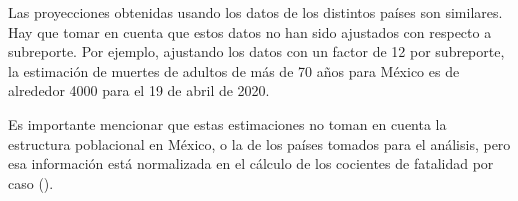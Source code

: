 Las proyecciones obtenidas usando los datos de los distintos países son similares. Hay que tomar en cuenta que estos datos no han sido ajustados con respecto a subreporte. Por ejemplo, ajustando los datos con un factor de 12 por subreporte, la estimación de  muertes de adultos de más de 70 años para México es  de alrededor 4000 para el 19 de abril de 2020. 


Es importante mencionar que estas estimaciones no toman en cuenta la estructura poblacional en México, o la de los países tomados para el análisis, pero esa información está normalizada en el cálculo de los cocientes de fatalidad por caso (). 





